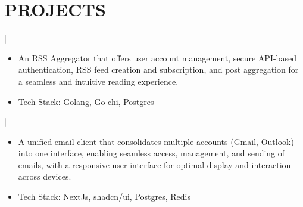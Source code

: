 \documentclass[]{resume}
\begin{document}
\section{PROJECTS}
 | \href{https://github.com/saswatax/rss-aggregator}{\faGithub}
\begin{itemize}
  \item An RSS Aggregator that offers user account management, secure API-based authentication, RSS feed creation and subscription, and post aggregation for a seamless and intuitive reading experience.
  \item Tech Stack: Golang, Go-chi, Postgres
\end{itemize}
 | \href{https://github.com/saswatax/email-client}{\faGithub}
\begin{itemize}
  \item A unified email client that consolidates multiple accounts (Gmail, Outlook) into one interface, enabling seamless access, management, and sending of emails, with a responsive user interface for optimal display and interaction across devices.
  \item Tech Stack: NextJs, shadcn/ui, Postgres, Redis
\end{itemize}
\end{document}
